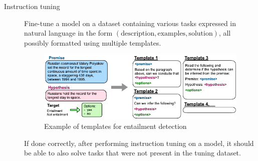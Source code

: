 \begin{description}
    \item[Instruction tuning] 
        Fine-tune a model on a dataset containing various tasks expressed in natural language in the form $(\text{description}, \text{examples}, \text{solution})$, all possibly formatted using multiple templates.

        \begin{figure}[H]
            \centering
            \includegraphics[width=0.7\linewidth]{./img/_instruction_tuning.pdf}
            \caption{Example of templates for entailment detection}
        \end{figure}

        \begin{remark}
            If done correctly, after performing instruction tuning on a model, it should be able to also solve tasks that were not present in the tuning dataset.
        \end{remark}


\end{description}
